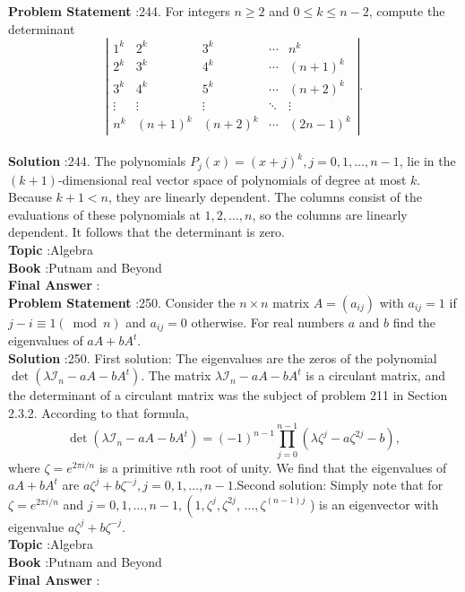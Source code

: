 \documentclass[10pt]{article}
\begin{document}
\textbf{Problem Statement} :244. For integers $n \geq 2$ and $0 \leq k \leq n-2$, compute the determinant$$ \left|\begin{array}{ccccc} 1^{k} & 2^{k} & 3^{k} & \cdots & n^{k} \\ 2^{k} & 3^{k} & 4^{k} & \cdots & (n+1)^{k} \\ 3^{k} & 4^{k} & 5^{k} & \cdots & (n+2)^{k} \\ \vdots & \vdots & \vdots & \ddots & \vdots \\ n^{k} & (n+1)^{k} & (n+2)^{k} & \cdots & (2 n-1)^{k} \end{array}\right| . $$\\
\textbf{Solution} :244. The polynomials $P_{j}(x)=(x+j)^{k}, j=0,1, \ldots, n-1$, lie in the $(k+1)$-dimensional real vector space of polynomials of degree at most $k$. Because $k+1<n$, they are linearly dependent. The columns consist of the evaluations of these polynomials at $1,2, \ldots, n$, so the columns are linearly dependent. It follows that the determinant is zero.\\
\textbf{Topic} :Algebra\\
\textbf{Book} :Putnam and Beyond\\
\textbf{Final Answer} :\\


\textbf{Problem Statement} :250. Consider the $n \times n$ matrix $A=\left(a_{i j}\right)$ with $a_{i j}=1$ if $j-i \equiv 1(\bmod n)$ and $a_{i j}=0$ otherwise. For real numbers $a$ and $b$ find the eigenvalues of $a A+b A^{t}$.\\
\textbf{Solution} :250. First solution: The eigenvalues are the zeros of the polynomial $\operatorname{det}\left(\lambda \mathcal{I}_{n}-a A-b A^{t}\right)$. The matrix $\lambda \mathcal{I}_{n}-a A-b A^{t}$ is a circulant matrix, and the determinant of a circulant matrix was the subject of problem 211 in Section 2.3.2. According to that formula,$$ \operatorname{det}\left(\lambda \mathcal{I}_{n}-a A-b A^{t}\right)=(-1)^{n-1} \prod_{j=0}^{n-1}\left(\lambda \zeta^{j}-a \zeta^{2 j}-b\right), $$where $\zeta=e^{2 \pi i / n}$ is a primitive $n$th root of unity. We find that the eigenvalues of $a A+b A^{t}$ are $a \zeta^{j}+b \zeta^{-j}, j=0,1, \ldots, n-1$.Second solution: Simply note that for $\zeta=e^{2 \pi i / n}$ and $j=0,1, \ldots, n-1,\left(1, \zeta^{j}, \zeta^{2 j}\right.$, $\ldots, \zeta^{(n-1) j}$ ) is an eigenvector with eigenvalue $a \zeta^{j}+b \zeta^{-j}$.\\
\textbf{Topic} :Algebra\\
\textbf{Book} :Putnam and Beyond\\
\textbf{Final Answer} :\\
\end{document}
